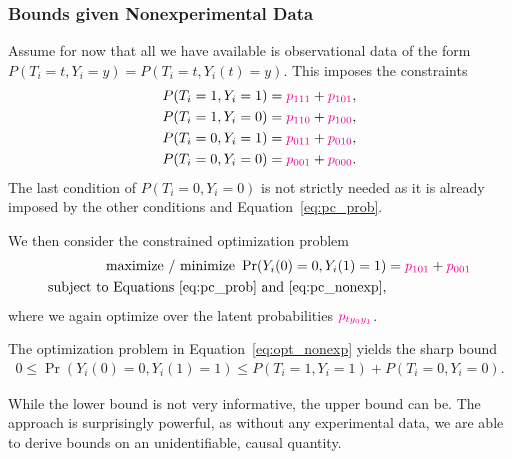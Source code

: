 \documentclass[11pt]{exam}
\begin{document}
\subsubsection{Bounds given Nonexperimental Data}
Assume for now that all we have available is observational data of the form $P(T_i = t, Y_i = y) = P(T_i = t, Y_i(t) = y)$. This imposes the constraints
\begin{align}\label{eq:pc_nonexp}
    P(T_i = 1, Y_i = 1) &= \textcolor{magenta}{p_{1 1 1}} + \textcolor{magenta}{p_{1 0 1}},
    \notag
    \\
    P(T_i = 1, Y_i = 0) &= \textcolor{magenta}{p_{1 1 0}} + \textcolor{magenta}{p_{1 0 0}},
    \\
    \notag
    P(T_i = 0, Y_i = 1) &= \textcolor{magenta}{p_{0 1 1}} + \textcolor{magenta}{p_{0 1 0}},
    \\
    \notag
    P(T_i = 0, Y_i = 0) &= \textcolor{magenta}{p_{0 0 1}} + \textcolor{magenta}{p_{0 0 0}}.
\end{align}
The last condition of $P(T_i = 0, Y_i = 0)$ is not strictly needed as it is already imposed by the other conditions and Equation~\eqref{eq:pc_prob}.

We then consider the constrained optimization problem
\begin{align}\label{eq:opt_nonexp}
    \text{maximize / minimize } \Pr(Y_i(0) = 0, Y_i(1) = 1) &= \textcolor{magenta}{p_{1 0 1}} + \textcolor{magenta}{p_{0 0 1}}
    \\
    \text{subject to Equations~\eqref{eq:pc_prob} and~\eqref{eq:pc_nonexp}},
    \notag
\end{align}
where we again optimize over the latent probabilities $\textcolor{magenta}{p_{t y_0 y_1}}$.

\begin{theorem}
    The optimization problem in Equation~\eqref{eq:opt_nonexp} yields the sharp bound
    \begin{align*}
        0 \leq \Pr(Y_i(0) = 0, Y_i(1) = 1) \leq P(T_i = 1, Y_i = 1) + P(T_i = 0, Y_i = 0).
    \end{align*}
\end{theorem}
While the lower bound is not very informative, the upper bound can be. The approach is surprisingly powerful, as without any experimental data, we are able to derive bounds on an unidentifiable, causal quantity.
\end{document}
